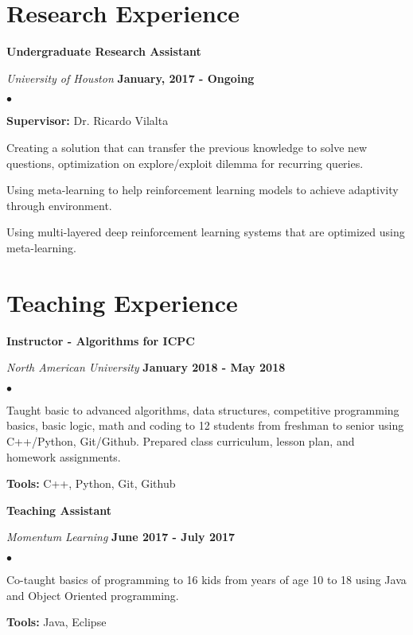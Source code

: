 \documentclass[margin,line]{res}
\newenvironment{list2}{
  \begin{list}{$\bullet$}{%
      \setlength{\itemsep}{0in}
      \setlength{\parsep}{0in} \setlength{\parskip}{0in}
      \setlength{\topsep}{0in} \setlength{\partopsep}{0in} 
      \setlength{\leftmargin}{0.2in}}}{\end{list}}
\begin{document}
\begin{resume}
\section{\sc Research Experience}

{\bf Undergraduate Research Assistant}

\vspace{-.3cm}
{\em University of Houston} \hfill {\bf January, 2017 - Ongoing}\\ 
\vspace{-.3cm}
\begin{list2}
\item \textbf{Supervisor:} Dr. Ricardo Vilalta
\item Creating a solution that can transfer the previous knowledge to solve new questions, optimization on explore/exploit dilemma for recurring queries. 
\item Using meta-learning to help reinforcement learning models to achieve adaptivity through environment. 
\item Using multi-layered deep reinforcement learning systems that are optimized using meta-learning. 
\end{list2}

\section{\sc Teaching Experience}
{\bf Instructor - Algorithms for ICPC}

\vspace{-.3cm}
{\em North American University} \hfill {\bf January 2018 - May 2018}\\
\begin{list2}
\item Taught basic to advanced algorithms, data structures, competitive programming basics, basic logic, math and coding to 12 students from freshman to senior using C++/Python, Git/Github. Prepared class curriculum, lesson plan, and homework assignments.
\item \textbf{Tools:} C++, Python, Git, Github
\end{list2}
\vspace*{.05in}

{\bf Teaching Assistant}

\vspace{-.3cm}
{\em Momentum Learning} \hfill {\bf June 2017 - July 2017}\\
\begin{list2}
\item Co-taught basics of programming to 16 kids from years of age 10 to 18 using Java and Object Oriented programming.
\item \textbf{Tools:} Java, Eclipse
\end{list2}
\vspace*{.05in}


\end{resume}
\end{document}
